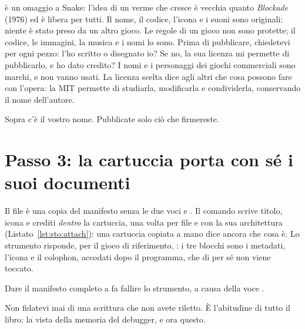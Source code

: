 \vermone è un omaggio a Snake: l'idea di un verme che cresce è vecchia quanto
\emph{Blockade} (1976) ed è libera per tutti. Il nome, il codice, l'icona e i
suoni sono originali: niente è stato preso da un altro gioco. Le regole di un
gioco non sono protette; il codice, le immagini, la musica e i nomi lo sono.
Prima di pubblicare, chiedetevi per ogni pezzo: l'ho scritto o disegnato io?
Se no, la sua licenza mi permette di pubblicarlo, e ho dato credito? I nomi e
i personaggi dei giochi commerciali sono marchi, e non vanno usati. La licenza
scelta dice agli altri che cosa possono fare con l'opera: la MIT permette di
studiarla, modificarla e condividerla, conservando il nome dell'autore.

\begin{prgconcept}[La regola]
Sopra c'è il vostro nome. Pubblicate solo ciò che firmereste.
\end{prgconcept}

\section{Passo 3: la cartuccia porta con sé i suoi documenti}


Il file  è una copia del manifesto senza le due voci
 e . Il comando  scrive
titolo, icona e crediti \emph{dentro} la cartuccia, una volta per file e con la
sua architettura (Listato~\ref{lst:sto:attach}): una cartuccia copiata a mano
dice ancora che cosa è. Lo strumento risponde, per il gioco di riferimento,
: i tre blocchi sono i metadati, l'icona e il
colophon, accodati dopo il programma, che di per sé non viene toccato.

\begin{prgwarn}
Dare il manifesto completo a  fa fallire lo strumento, a
causa della voce .
\end{prgwarn}


\begin{prgconcept}
Non fidatevi mai di una scrittura che non avete riletto. È l'abitudine di tutto
il libro: la vista della memoria del debugger, e ora questo.
\end{prgconcept}

